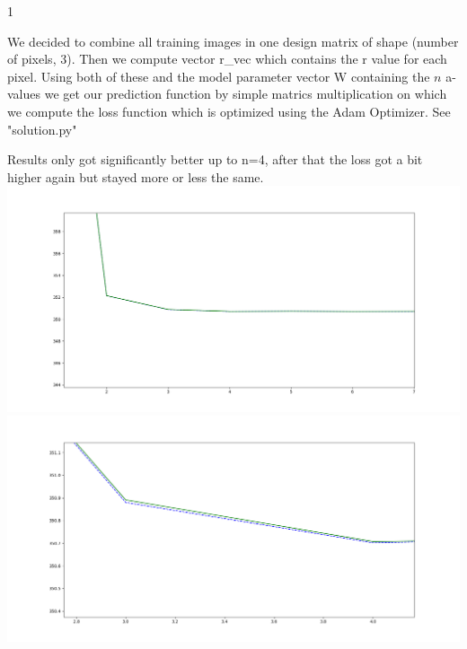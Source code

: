 \documentclass{article}
\begin{document}
    \begin{ukon-infie}[12.11.17]{1}

		
		\begin{exercise}[p=20]{}
		We decided to combine all training images in one design matrix of shape (number of pixels, 3). Then we compute vector r\_vec which contains the r value for each pixel.  Using both of these and the model parameter vector W containing the $n$ a-values we get our prediction function by simple matrics multiplication on which we compute the loss function which is optimized using the Adam Optimizer. See "solution.py" 	
		\end{exercise}
		
		\begin{exercise}[p=10]{}
        Results only got significantly better up to n=4, after that the loss got a bit higher again but stayed more or less the same.\\
        \includegraphics[scale=0.2]{Figure_1}	
        \includegraphics[scale=0.2]{Figure_1-2}
		\end{exercise}
		
		\begin{exercise}[p=10]{}
        	
		\end{exercise}
		

\end{ukon-infie}
\end{document}
